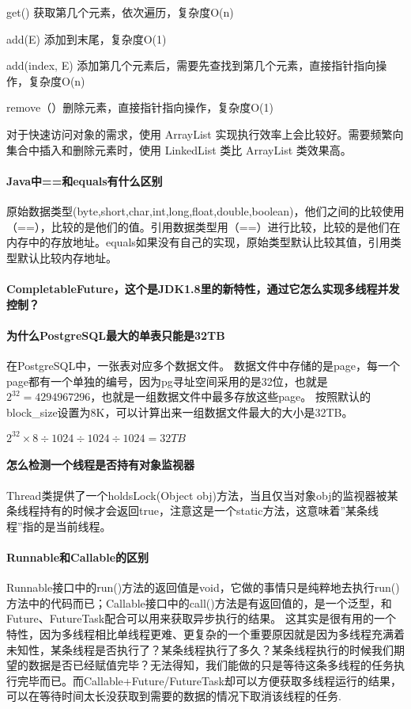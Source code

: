 \documentclass[../../../interview-questions.tex]{subfiles}
\begin{document}
get() 获取第几个元素，依次遍历，复杂度O(n)

add(E) 添加到末尾，复杂度O(1)

add(index, E) 添加第几个元素后，需要先查找到第几个元素，直接指针指向操作，复杂度O(n)

remove（）删除元素，直接指针指向操作，复杂度O(1)

对于快速访问对象的需求，使用 ArrayList 实现执行效率上会比较好。需要频繁向集合中插入和删除元素时，使用 LinkedList 类比 ArrayList 类效果高。

\paragraph{Java中==和equals有什么区别}

原始数据类型(byte,short,char,int,long,float,double,boolean)，他们之间的比较使用（==），比较的是他们的值。引用数据类型用（==）进行比较，比较的是他们在内存中的存放地址。equals如果没有自己的实现，原始类型默认比较其值，引用类型默认比较内存地址。

\paragraph{CompletableFuture，这个是JDK1.8里的新特性，通过它怎么实现多线程并发控制？}

\paragraph{为什么PostgreSQL最大的单表只能是32TB}

在PostgreSQL中，一张表对应多个数据文件。
数据文件中存储的是page，每一个page都有一个单独的编号，因为pg寻址空间采用的是32位，也就是$2^{32}=4294967296$，也就是一组数据文件中最多存放这些page。
按照默认的block\_size设置为8K，可以计算出来一组数据文件最大的大小是32TB。


$2^{32} \times 8 \div 1024 \div 1024 \div 1024 = 32TB$

\paragraph{怎么检测一个线程是否持有对象监视器}

Thread类提供了一个holdsLock(Object obj)方法，当且仅当对象obj的监视器被某条线程持有的时候才会返回true，注意这是一个static方法，这意味着”某条线程”指的是当前线程。

\paragraph{Runnable和Callable的区别}

Runnable接口中的run()方法的返回值是void，它做的事情只是纯粹地去执行run()方法中的代码而已；Callable接口中的call()方法是有返回值的，是一个泛型，和Future、FutureTask配合可以用来获取异步执行的结果。
这其实是很有用的一个特性，因为多线程相比单线程更难、更复杂的一个重要原因就是因为多线程充满着未知性，某条线程是否执行了？某条线程执行了多久？某条线程执行的时候我们期望的数据是否已经赋值完毕？无法得知，我们能做的只是等待这条多线程的任务执行完毕而已。而Callable+Future/FutureTask却可以方便获取多线程运行的结果，可以在等待时间太长没获取到需要的数据的情况下取消该线程的任务.
\end{document}
